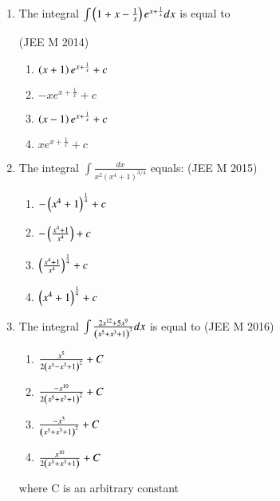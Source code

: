 \documentclass[journal,12pt,twocolumn]{IEEEtran}
\theoremstyle{remark}
\begin{document}
\begin{enumerate}[label=\textcolor{black}{\arabic*.}]
		(d) $\frac{1}{3}[x^3\psi\brak{x^3}-\int x^3\psi(x^3)dx] + C$

	\item The integral $\int\left(1+x-\frac{1}{x}\right)e^{x+\frac{1}{x}}dx$ is equal to

		\hfill{(JEE M 2014)}

		\begin{multicols}{2}
			\begin{enumerate}[label=(\alph*)]
				\item $\left(x+1\right)e^{x+\frac{1}{x}}+c$
				\item $-xe^{x+\frac{1}{x}}+c$
				\item $\left(x-1\right)e^{x+\frac{1}{x}}+c$
				\item $xe^{x+\frac{1}{x}}+c$
			\end{enumerate}
		\end{multicols}

	\item The integral $\int\frac{dx}{x^2(x^4+1)^{3/4}}$ equals:
		\hfill{(JEE M 2015)}

		\begin{multicols}{2}
			\begin{enumerate}[label=(\alph*)]
				\item $-\left(x^4+1\right)^{\frac{1}{4}}+c$
				\item $-\left(\frac{x^4+1}{x^4}\right)+c$
				\item $\left(\frac{x^4+1}{x^4}\right)^{\frac{1}{4}}+c$
				\item $\left(x^4+1\right)^{\frac{1}{4}}+c$
			\end{enumerate}
		\end{multicols}

	\item The integral $\int\frac{2x^{12}+5x^9}{\left(x^5+x^3+1\right)^3}dx$ is equal to
		\hfill{(JEE M 2016)}

		\begin{multicols}{2}
			\begin{enumerate}[label=(\alph*)]
				\item $\frac{x^5}{2\left(x^5-x^3+1\right)^2}+C$
				\item $\frac{-x^{10}}{2\left(x^5+x^3+1\right)^2}+C$
				\item $\frac{-x^5}{\left(x^5+x^3+1\right)^2}+C$
				\item $\frac{x^{10}}{2\left(x^5+x^3+1\right)}+C$
			\end{enumerate}
		\end{multicols}
		where C is an arbitrary constant


\end{enumerate}
\end{document}
